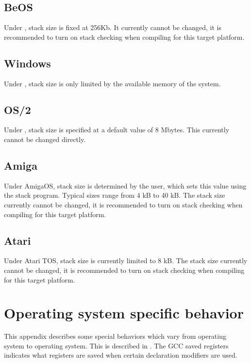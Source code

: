 \section{BeOS}

Under \beos, stack size is fixed at 256Kb. It currently
cannot be changed, it is recommended to turn on stack
checking when compiling for this target platform.

\section{Windows}

Under \windows, stack size is only limited by the available memory of
the system.

\section{OS/2}

Under \ostwo, stack size is specified at a default
value of 8 Mbytes. This currently cannot be changed
directly.

\section{Amiga}

Under AmigaOS, stack size is determined by the user, which sets this
value using the stack program. Typical sizes range from 4 kB to 40 kB.
The stack size currently cannot be changed, it is recommended to turn
on stack checking when compiling for this target platform.

\section{Atari}

Under Atari TOS, stack size is currently limited to 8 kB.
The stack size currently cannot be changed, it is recommended to turn
on stack checking when compiling for this target platform.


\chapter{Operating system specific behavior}
\label{ch:AppI}

This appendix describes some special behaviors which vary
from operating system to operating system. This is described
in . The GCC saved registers indicates what
registers are saved when certain declaration modifiers are used.


